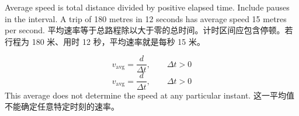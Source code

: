  {Average speed is total distance divided by positive elapsed time. Include pauses in the interval. A trip of 180 metres in 12 seconds has average speed 15 metres per second.}
 {平均速率等于总路程除以大于零的总时间。计时区间应包含停顿。若行程为 180 米、用时 12 秒，平均速率就是每秒 15 米。}
\begin{ParallelKeep}
 {\[v_{\mathrm{avg}}=\frac{d}{\Delta t},\qquad \Delta t>0\]}
 {\[v_{\mathrm{avg}}=\frac{d}{\Delta t},\qquad \Delta t>0\]}
 {This average does not determine the speed at any particular instant.}
 {这一平均值不能确定任意特定时刻的速率。}
\end{ParallelKeep}
